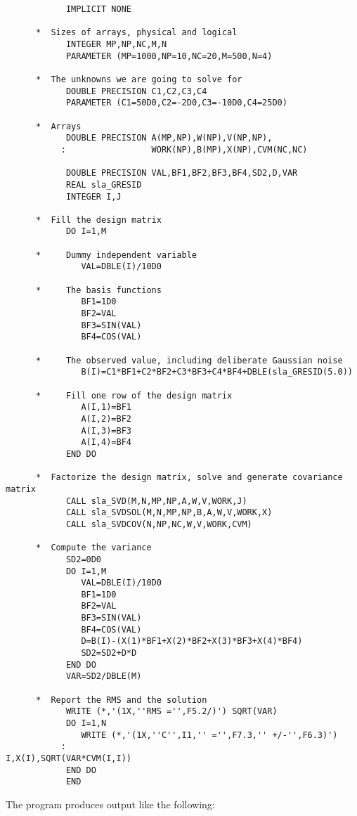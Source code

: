 \documentclass[11pt,twoside]{article}
\begin{document}
\begin{verbatim}
            IMPLICIT NONE

      *  Sizes of arrays, physical and logical
            INTEGER MP,NP,NC,M,N
            PARAMETER (MP=1000,NP=10,NC=20,M=500,N=4)

      *  The unknowns we are going to solve for
            DOUBLE PRECISION C1,C2,C3,C4
            PARAMETER (C1=50D0,C2=-2D0,C3=-10D0,C4=25D0)

      *  Arrays
            DOUBLE PRECISION A(MP,NP),W(NP),V(NP,NP),
           :                 WORK(NP),B(MP),X(NP),CVM(NC,NC)

            DOUBLE PRECISION VAL,BF1,BF2,BF3,BF4,SD2,D,VAR
            REAL sla_GRESID
            INTEGER I,J

      *  Fill the design matrix
            DO I=1,M

      *     Dummy independent variable
               VAL=DBLE(I)/10D0

      *     The basis functions
               BF1=1D0
               BF2=VAL
               BF3=SIN(VAL)
               BF4=COS(VAL)

      *     The observed value, including deliberate Gaussian noise
               B(I)=C1*BF1+C2*BF2+C3*BF3+C4*BF4+DBLE(sla_GRESID(5.0))

      *     Fill one row of the design matrix
               A(I,1)=BF1
               A(I,2)=BF2
               A(I,3)=BF3
               A(I,4)=BF4
            END DO

      *  Factorize the design matrix, solve and generate covariance matrix
            CALL sla_SVD(M,N,MP,NP,A,W,V,WORK,J)
            CALL sla_SVDSOL(M,N,MP,NP,B,A,W,V,WORK,X)
            CALL sla_SVDCOV(N,NP,NC,W,V,WORK,CVM)

      *  Compute the variance
            SD2=0D0
            DO I=1,M
               VAL=DBLE(I)/10D0
               BF1=1D0
               BF2=VAL
               BF3=SIN(VAL)
               BF4=COS(VAL)
               D=B(I)-(X(1)*BF1+X(2)*BF2+X(3)*BF3+X(4)*BF4)
               SD2=SD2+D*D
            END DO
            VAR=SD2/DBLE(M)

      *  Report the RMS and the solution
            WRITE (*,'(1X,''RMS ='',F5.2/)') SQRT(VAR)
            DO I=1,N
               WRITE (*,'(1X,''C'',I1,'' ='',F7.3,'' +/-'',F6.3)')
           :                                         I,X(I),SQRT(VAR*CVM(I,I))
            END DO
            END
\end{verbatim}
\goodbreak
The program produces output like the following:
\end{document}
